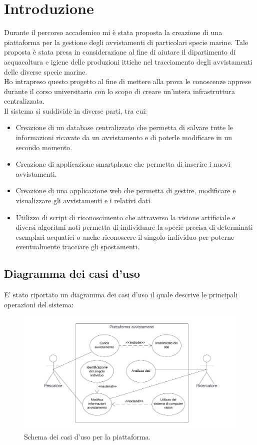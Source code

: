 \documentclass[a4paper,final,12pt]{report}
\begin{document}
\tableofcontents
\listoffigures
\setlength{\parindent}{0pt}

\chapter{Introduzione}
Durante il percorso accademico mi è stata proposta la creazione di una piattaforma per la gestione degli avvistamenti di particolari specie marine. Tale proposta è stata presa in considerazione al fine di aiutare il dipartimento di acquacoltura e igiene delle produzioni ittiche nel tracciamento degli avvistamenti delle diverse specie marine.\\
Ho intrapreso questo progetto al fine di mettere alla prova le conoscenze apprese durante il corso universitario con lo scopo di creare un'intera infrastruttura centralizzata.\\
Il sistema si suddivide in diverse parti, tra cui:
\begin{itemize}
\item Creazione di un database centralizzato che permetta di salvare tutte le informazioni ricavate da un avvistamento e di poterle modificare in un secondo momento.
\item Creazione di applicazione smartphone che permetta di inserire i nuovi avvistamenti.
\item Creazione di una applicazione web che permetta di gestire, modificare e visualizzare gli avvistamenti e i relativi dati.
\item Utilizzo di script di riconoscimento che attraverso la visione artificiale e diversi algoritmi noti permetta di individuare la specie precisa di determinati esemplari acquatici o anche riconoscere il singolo individuo per poterne eventualmente tracciare gli spostamenti.
\end{itemize}

\section{Diagramma dei casi d'uso}
E' stato riportato un diagramma dei casi d'uso il quale descrive le principali operazioni del sistema:

\begin{figure}[hbtp]
\centering
\includegraphics[scale=0.6]{img_concettuale/casi.png}
\caption{Schema dei casi d'uso per la piattaforma.}
\end{figure}
\end{document}
